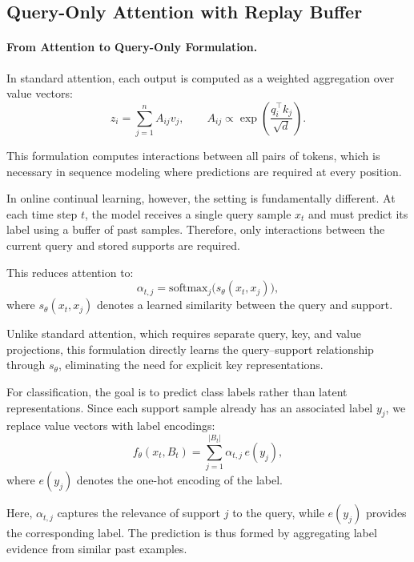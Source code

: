 \documentclass{article}
\begin{document}
\subsection{Query-Only Attention with Replay Buffer}
\label{sec:method}

\paragraph{From Attention to Query-Only Formulation.}
In standard attention, each output is computed as a weighted aggregation over value vectors:
\begin{equation}
z_i = \sum_{j=1}^{n} A_{ij} v_j, 
\qquad 
A_{ij} \propto \exp\left(\frac{q_i^\top k_j}{\sqrt{d}}\right).
\end{equation}

This formulation computes interactions between all pairs of tokens, which is necessary in sequence modeling where predictions are required at every position.

In online continual learning, however, the setting is fundamentally different. At each time step $t$, the model receives a single query sample $x_t$ and must predict its label using a buffer of past samples. Therefore, only interactions between the current query and stored supports are required.

This reduces attention to:
\begin{equation}
\alpha_{t,j} = \mathrm{softmax}_j\big(s_\theta(x_t, x_j)\big),
\end{equation}
where $s_\theta(x_t, x_j)$ denotes a learned similarity between the query and support.

Unlike standard attention, which requires separate query, key, and value projections, this formulation directly learns the query–support relationship through $s_\theta$, eliminating the need for explicit key representations.

For classification, the goal is to predict class labels rather than latent representations. Since each support sample already has an associated label $y_j$, we replace value vectors with label encodings:
\begin{equation}
f_\theta(x_t, B_t) = \sum_{j=1}^{|B_t|} \alpha_{t,j} \, e(y_j),
\end{equation}
where $e(y_j)$ denotes the one-hot encoding of the label.

Here, $\alpha_{t,j}$ captures the relevance of support $j$ to the query, while $e(y_j)$ provides the corresponding label. The prediction is thus formed by aggregating label evidence from similar past examples. 
\end{document}
